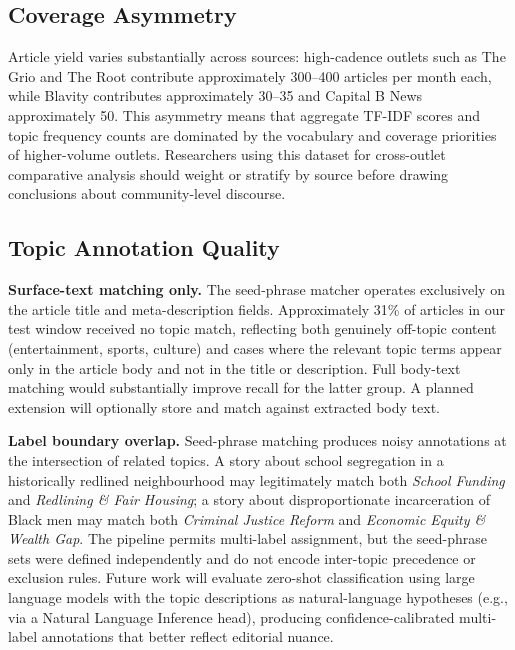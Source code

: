 \documentclass[sigconf,anonymous,review]{acmart}
\begin{document}
\subsection{Coverage Asymmetry}

Article yield varies substantially across sources: high-cadence outlets such as
The Grio and The Root contribute approximately 300--400 articles per month each,
while Blavity contributes approximately 30--35 and Capital B News approximately
50.
This asymmetry means that aggregate TF-IDF scores and topic frequency counts
are dominated by the vocabulary and coverage priorities of higher-volume outlets.
Researchers using this dataset for cross-outlet comparative analysis should
weight or stratify by source before drawing conclusions about community-level
discourse.

\subsection{Topic Annotation Quality}

\noindent\textbf{Surface-text matching only.}
The seed-phrase matcher operates exclusively on the article title and
meta-description fields.
Approximately 31\% of articles in our test window received no topic match,
reflecting both genuinely off-topic content (entertainment, sports, culture) and
cases where the relevant topic terms appear only in the article body and not in
the title or description.
Full body-text matching would substantially improve recall for the latter group.
A planned extension will optionally store and match against extracted body text.

\noindent\textbf{Label boundary overlap.}
Seed-phrase matching produces noisy annotations at the intersection of related
topics.
A story about school segregation in a historically redlined neighbourhood may
legitimately match both \emph{School Funding} and \emph{Redlining \& Fair
Housing}; a story about disproportionate incarceration of Black men may match
both \emph{Criminal Justice Reform} and \emph{Economic Equity \& Wealth Gap}.
The pipeline permits multi-label assignment, but the seed-phrase sets were
defined independently and do not encode inter-topic precedence or exclusion
rules.
Future work will evaluate zero-shot classification using large language models
with the topic descriptions as natural-language hypotheses
(e.g., via a Natural Language Inference head), producing confidence-calibrated
multi-label annotations that better reflect editorial nuance.
\end{document}

